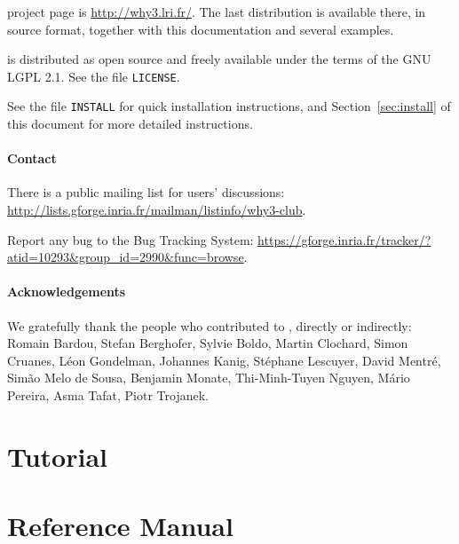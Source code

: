 \documentclass[a4paper,11pt,twoside,openright]{memoir}
\begin{document}
\why project page is \url{http://why3.lri.fr/}.  The last distribution
is available there, in source format, together with this documentation
and several examples.

\why is distributed as open source and freely available under the
terms of the GNU LGPL 2.1. See the file \texttt{LICENSE}.

See the file \texttt{INSTALL} for quick installation instructions, and
Section~\ref{sec:install} of this document for more detailed
instructions.

\subsection*{Contact}

There is a public mailing list for users' discussions:
\url{http://lists.gforge.inria.fr/mailman/listinfo/why3-club}.

Report any bug to the \why Bug Tracking System:
\url{https://gforge.inria.fr/tracker/?atid=10293&group_id=2990&func=browse}.


\subsection*{Acknowledgements}

We gratefully thank the people who contributed to \why, directly or
indirectly: Romain Bardou, Stefan Berghofer, Sylvie Boldo, Martin
Clochard, Simon Cruanes, L\'eon Gondelman, Johannes Kanig, St\'ephane
Lescuyer, David Mentr\'e, Sim\~ao Melo de Sousa, Benjamin Monate,
Thi-Minh-Tuyen Nguyen, M\'ario Pereira, Asma Tafat, Piotr Trojanek.


\cleardoublepage

\tableofcontents

%

\part{Tutorial}





% 





\part{Reference Manual}
\end{document}
